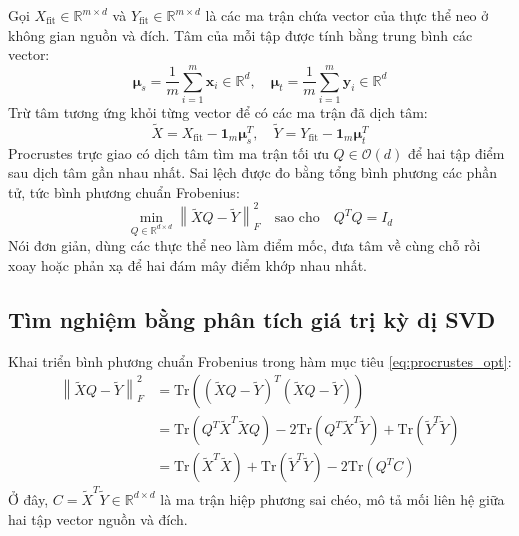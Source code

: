 Gọi $X_{\text{fit}} \in \mathbb{R}^{m \times d}$ và $Y_{\text{fit}} \in \mathbb{R}^{m \times d}$ là các ma trận chứa vector của thực thể neo ở không gian nguồn và đích. Tâm của mỗi tập được tính bằng trung bình các vector:
\begin{equation}
\boldsymbol{\mu}_s = \frac{1}{m} \sum_{i=1}^m \mathbf{x}_i \in \mathbb{R}^d, \quad \boldsymbol{\mu}_t = \frac{1}{m} \sum_{i=1}^m \mathbf{y}_i \in \mathbb{R}^d
\end{equation}
Trừ tâm tương ứng khỏi từng vector để có các ma trận đã dịch tâm:
\begin{equation}
\widetilde{X} = X_{\text{fit}} - \mathbf{1}_m \boldsymbol{\mu}_s^T, \quad \widetilde{Y} = Y_{\text{fit}} - \mathbf{1}_m \boldsymbol{\mu}_t^T
\end{equation}
Procrustes trực giao có dịch tâm tìm ma trận tối ưu $Q \in \mathcal{O}(d)$ để hai tập điểm sau dịch tâm gần nhau nhất. Sai lệch được đo bằng tổng bình phương các phần tử, tức bình phương chuẩn Frobenius:
\begin{equation}
\min_{Q \in \mathbb{R}^{d \times d}} \left\| \widetilde{X} Q - \widetilde{Y} \right\|_F^2 \quad \text{sao cho} \quad Q^T Q = I_d
\label{eq:procrustes_opt}
\end{equation}
Nói đơn giản, dùng các thực thể neo làm điểm mốc, đưa tâm về cùng chỗ rồi xoay hoặc phản xạ để hai đám mây điểm khớp nhau nhất.
\subsection{Tìm nghiệm bằng phân tích giá trị kỳ dị SVD}
Khai triển bình phương chuẩn Frobenius trong hàm mục tiêu \eqref{eq:procrustes_opt}:
\begin{align}
\left\| \widetilde{X} Q - \widetilde{Y} \right\|_F^2 &= \text{Tr}\left( (\widetilde{X} Q - \widetilde{Y})^T (\widetilde{X} Q - \widetilde{Y}) \right) \nonumber \\
&= \text{Tr}\left( Q^T \widetilde{X}^T \widetilde{X} Q \right) - 2 \text{Tr}\left( Q^T \widetilde{X}^T \widetilde{Y} \right) + \text{Tr}\left( \widetilde{Y}^T \widetilde{Y} \right) \nonumber \\
&= \text{Tr}\left( \widetilde{X}^T \widetilde{X} \right) + \text{Tr}\left( \widetilde{Y}^T \widetilde{Y} \right) - 2 \text{Tr}\left( Q^T C \right)
\end{align}
Ở đây, $C = \widetilde{X}^T \widetilde{Y} \in \mathbb{R}^{d \times d}$ là ma trận hiệp phương sai chéo, mô tả mối liên hệ giữa hai tập vector nguồn và đích.

